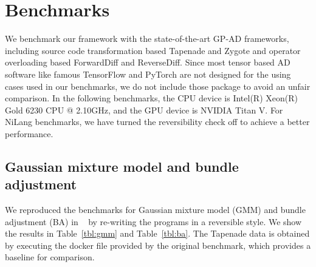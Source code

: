 \documentclass{article}
\newcommand{\<}{\langle}
\renewcommand{\>}{\rangle}
\newcommand{\Tbl}[1]{Table~\ref{#1}}
\theoremstyle{definition}\newtheorem{definition}{\textit{Definition}}
\begin{document}
\section{Benchmarks}\label{sec:benchmark}

We benchmark our framework with the state-of-the-art GP-AD frameworks, including source code transformation based Tapenade and Zygote and operator overloading based ForwardDiff and ReverseDiff. 
Since most tensor based AD software like famous TensorFlow and PyTorch are not designed for the using cases used in our benchmarks, we do not include those package to avoid an unfair comparison.
In the following benchmarks, the CPU device is Intel(R) Xeon(R) Gold 6230 CPU @ 2.10GHz, and the GPU device is NVIDIA Titan V.
For NiLang benchmarks, we have turned the reversibility check off to achieve a better performance.

\subsection{Gaussian mixture model and bundle adjustment}\label{sec:ba}

We reproduced the benchmarks for Gaussian mixture model (GMM) and bundle adjustment (BA) in ~\cite{Srajer2018} by re-writing the programs in a reversible style. We show the results in \Tbl{tbl:gmm} and \Tbl{tbl:ba}. The Tapenade data is obtained by executing the docker file provided by the original benchmark, which provides a baseline for comparison.
\end{document}
